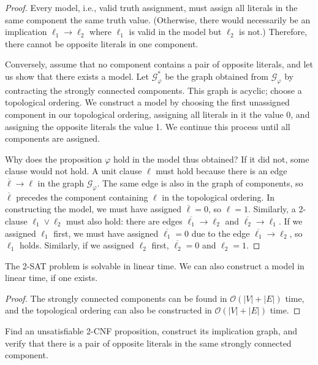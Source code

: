 \begin{proof}
    Every model, i.e., valid truth assignment, must assign all literals in the same component the same truth value. (Otherwise, there would necessarily be an implication $\ell_1 \rightarrow \ell_2$ where $\ell_1$ is valid in the model but $\ell_2$ is not.) Therefore, there cannot be opposite literals in one component.

    Conversely, assume that no component contains a pair of opposite literals, and let us show that there exists a model. Let $\mathcal{G}_\varphi^\ast$ be the graph obtained from $\mathcal{G}_\varphi$ by contracting the strongly connected components. This graph is acyclic; choose a topological ordering. We construct a model by choosing the first unassigned component in our topological ordering, assigning all literals in it the value 0, and assigning the opposite literals the value 1. We continue this process until all components are assigned.

    Why does the proposition $\varphi$ hold in the model thus obtained? If it did not, some clause would not hold. A unit clause $\ell$ must hold because there is an edge $\overline{\ell} \rightarrow \ell$ in the graph $\mathcal{G}_\varphi$. The same edge is also in the graph of components, so $\overline{\ell}$ precedes the component containing $\ell$ in the topological ordering. In constructing the model, we must have assigned $\overline{\ell} = 0$, so $\ell = 1$. Similarly, a 2-clause $\ell_1 \lor \ell_2$ must also hold: there are edges $\overline{\ell_1} \rightarrow \ell_2$ and $\overline{\ell_2} \rightarrow \ell_1$. If we assigned $\ell_1$ first, we must have assigned $\overline{\ell_1} = 0$ due to the edge $\overline{\ell_1} \rightarrow \ell_2$, so $\ell_1$ holds. Similarly, if we assigned $\ell_2$ first, $\overline{\ell_2} = 0$ and $\ell_2 = 1$.
\end{proof}

\begin{corollary}
    The 2-SAT problem is solvable in linear time. We can also construct a model in linear time, if one exists.
\end{corollary}

\begin{proof}
The strongly connected components can be found in $\mathcal{O}(|V| + |E|)$ time, and the topological ordering can also be constructed in $\mathcal{O}(|V| + |E|)$ time.
\end{proof}

\begin{exercise}
    Find an unsatisfiable 2-CNF proposition, construct its implication graph, and verify that there is a pair of opposite literals in the same strongly connected component.
\end{exercise}

